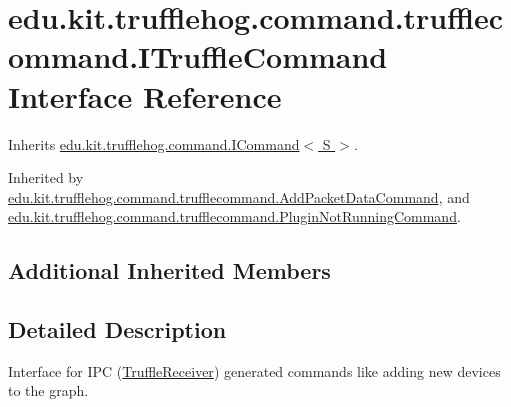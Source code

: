 \hypertarget{interfaceedu_1_1kit_1_1trufflehog_1_1command_1_1trufflecommand_1_1_i_truffle_command}{}\section{edu.\+kit.\+trufflehog.\+command.\+trufflecommand.\+I\+Truffle\+Command Interface Reference}
\label{interfaceedu_1_1kit_1_1trufflehog_1_1command_1_1trufflecommand_1_1_i_truffle_command}


Inherits \hyperlink{interfaceedu_1_1kit_1_1trufflehog_1_1command_1_1_i_command}{edu.\+kit.\+trufflehog.\+command.\+I\+Command$<$ S $>$}.



Inherited by \hyperlink{classedu_1_1kit_1_1trufflehog_1_1command_1_1trufflecommand_1_1_add_packet_data_command}{edu.\+kit.\+trufflehog.\+command.\+trufflecommand.\+Add\+Packet\+Data\+Command}, and \hyperlink{classedu_1_1kit_1_1trufflehog_1_1command_1_1trufflecommand_1_1_plugin_not_running_command}{edu.\+kit.\+trufflehog.\+command.\+trufflecommand.\+Plugin\+Not\+Running\+Command}.

\subsection*{Additional Inherited Members}


\subsection{Detailed Description}
Interface for I\+P\+C (\hyperlink{}{Truffle\+Receiver}) generated commands like adding new devices to the graph. 